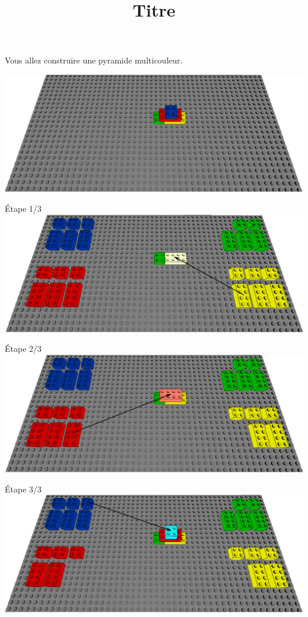 \documentclass[aspectratio=169]{beamer}
\title{Titre}
\begin{document}
\begin{frame}
    Vous allez construire une pyramide multicouleur.
    \vfill
    \begin{center}
        \includegraphics[width=\linewidth]{figure.png}
    \end{center}
\end{frame}

\begin{frame}
    Étape 1/3
    \vfill
  \includegraphics[width=\linewidth]{step1.png}
\end{frame}

\begin{frame}
    Étape 2/3
    \vfill
  \includegraphics[width=\linewidth]{step2.png}
\end{frame}

\begin{frame}
    Étape 3/3
    \vfill
  \includegraphics[width=\linewidth]{step3.png}
\end{frame}
\end{document}
